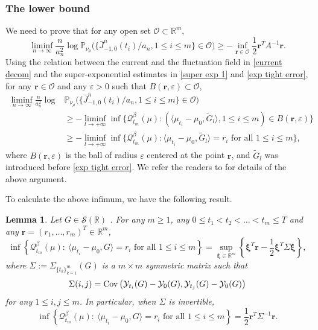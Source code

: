 \documentclass[reqno,11pt]{amsart}
\numberwithin{equation}{section}
\newtheorem{lemma}[theorem]{Lemma}
\newcommand{\R}{\mathbb{R}}
\newcommand{\Scal}{\mathcal{S}}
\begin{document}
\subsubsection{The lower bound} We need to prove that for any open set $\mathcal{O} \subset \R^m$,
\begin{equation*}
	\liminf_{n \rightarrow \infty} \frac{n}{a_n^2} \log \mathbb{P}_{\nu_{\rho}} \Big( \{\bar{J}^n_{-1,0} (t_i)/a_n, 1 \leq i \leq m\} \in \mathcal{O} \Big) \geq - \inf_{\mathbf{r} \in \mathcal{O}} \frac{1}{2} \mathbf{r}^T A^{-1} \mathbf{r}.
\end{equation*}
Using the relation between the current and the fluctuation field in \eqref{current decom} and the super-exponential estimates in \eqref{super exp 1} and \eqref{exp tight error}, for any $\mathbf{r} \in  \mathcal{O}$ and any  $\varepsilon > 0$ such that $B(\mathbf{r},\varepsilon) \subset \mathcal{O}$,
 \begin{align*}
 	\liminf_{n \rightarrow \infty} \frac{n}{a_n^2} \log &\mathbb{P}_{\nu_{\rho}} \Big( \{\bar{J}^n_{-1,0} (t_i)/a_n, 1 \leq i \leq m\} \in \mathcal{O} \Big) \\
 	&\geq - \liminf_{l\rightarrow+\infty} \inf \{\mathcal{Q}^\beta_{t_m} (\mu): (\langle \mu_{t_i} - \mu_{0}, \tilde{G}_l\rangle, 1 \leq i \leq m ) \in B(\mathbf{r},\varepsilon)\}\\
 	&\geq - \liminf_{l\rightarrow+\infty} \inf \{\mathcal{Q}^\beta_{t_m} (\mu): \langle \mu_{t_i} - \mu_{0}, \tilde{G}_l \rangle=r_i\text{~for all~}1\leq i\leq m \},
 \end{align*}
where $B(\mathbf{r},\varepsilon)$ is the ball of radius $\varepsilon$ centered at the point $\mathbf{r}$, and $\tilde{G}_l$ was introduced before \eqref{exp tight error}. We refer the readers to \cite[Proof of (6.2)]{xue2024sample} for details of the above argument.  

To calculate the above infimum, we have the following result.

\begin{lemma}\label{lemma 5.1}
Let $G\in \Scal(\R)$ . For any $m \geq 1$,  any $0 \leq t_1 < t_2 < \ldots < t_m \leq T$ and any $\mathbf{r}=(r_1,\ldots, r_m)^T\in \mathbb{R}^m$,
\[		\inf\left\{\mathcal{Q}^\beta_{t_m} (\mu):~ \langle \mu_{t_i} - \mu_{0}, G \rangle=r_i\text{~for all~}1\leq i\leq m\right\}
=\sup_{\bm{\xi} \in \R^m}\left\{\bm{\xi}^T \mathbf{r}-\frac{1}{2}\bm{\xi}^T \Sigma \bm{\xi}\right\},\]
	where $\Sigma := \Sigma_{\{t_k\}_{k=1}^m}(G)$ is a $m\times m$ symmetric matrix such that
	\[
	\Sigma (i,j)={\rm Cov}\left(\mathcal{Y}_{t_i}(G)-\mathcal{Y}_{0}(G), \mathcal{Y}_{t_j}(G)-\mathcal{Y}_{0}(G)\right)
	\]
	for any $1\leq i,j\leq m$. In particular, when $\Sigma$ is invertible, 
	\[
\inf\left\{\mathcal{Q}^\beta_{t_m} (\mu):~ \langle \mu_{t_i} - \mu_{0}, G \rangle=r_i\text{~for all~}1\leq i\leq m\right\}=\frac{1}{2} \mathbf{r}^T\Sigma^{-1} \mathbf{r} .
	\]
\end{lemma}
\end{document}
